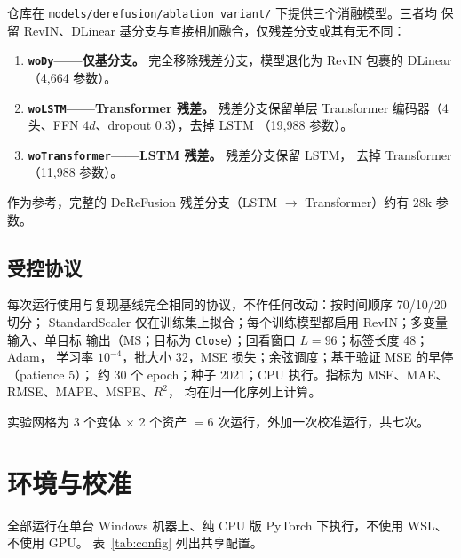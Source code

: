 \documentclass[11pt, a4paper]{ctexart}
\begin{document}
仓库在 \texttt{models/derefusion/ablation\_variant/} 下提供三个消融模型。三者均
保留 RevIN、DLinear 基分支与直接相加融合，仅残差分支或其有无不同：

\begin{enumerate}
  \item \textbf{\texttt{woDy}——仅基分支。} 完全移除残差分支，模型退化为
        RevIN 包裹的 DLinear（4{,}664 参数）。
  \item \textbf{\texttt{woLSTM}——Transformer 残差。} 残差分支保留单层
        Transformer 编码器（4 头、FFN $4d$、dropout 0.3），去掉 LSTM
        （19{,}988 参数）。
  \item \textbf{\texttt{woTransformer}——LSTM 残差。} 残差分支保留 LSTM，
        去掉 Transformer（11{,}988 参数）。
\end{enumerate}

作为参考，完整的 DeReFusion 残差分支（LSTM $\rightarrow$ Transformer）约有
28k 参数。

\subsection{受控协议}

每次运行使用与复现基线完全相同的协议，不作任何改动：按时间顺序 70/10/20 切分；
StandardScaler 仅在训练集上拟合；每个训练模型都启用 RevIN；多变量输入、单目标
输出（MS；目标为 \texttt{Close}）；回看窗口 $L{=}96$；标签长度 48；Adam，
学习率 $10^{-4}$，批大小 32，MSE 损失；余弦调度；基于验证 MSE 的早停（patience 5）；
约 30 个 epoch；种子 2021；CPU 执行。指标为 MSE、MAE、RMSE、MAPE、MSPE、$R^2$，
均在归一化序列上计算。

实验网格为 3 个变体 $\times$ 2 个资产 $=6$ 次运行，外加一次校准运行，共七次。

\section{环境与校准}

全部运行在单台 Windows 机器上、纯 CPU 版 PyTorch 下执行，不使用 WSL、不使用 GPU。
表~\ref{tab:config} 列出共享配置。
\end{document}
